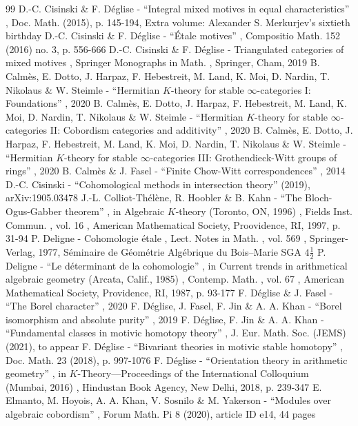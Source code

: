 \documentclass[11pt]{article}
\numberwithin{equation}{section}\renewcommand{\encodingdefault}{TU}
\theoremstyle{remark}
\theoremstyle{definition}
\numberwithin{equation}{thm}
\begin{document}
\begin{thebibliography}{99}
 D.-C. Cisinski \& F. Déglise - “Integral mixed motives in equal characteristics” , Doc. Math. (2015), p. 145-194, Extra volume: Alexander S. Merkurjev’s sixtieth birthday
 D.-C. Cisinski \& F. Déglise - “Étale motives” , Compositio Math. 152 (2016) no. 3, p. 556-666
 D.-C. Cisinski \& F. Déglise - Triangulated categories of mixed motives , Springer Monographs in Math. , Springer, Cham, 2019
 B. Calmès, E. Dotto, J. Harpaz, F. Hebestreit, M. Land, K. Moi, D. Nardin, T. Nikolaus \& W. Steimle - “Hermitian $K$-theory for stable $\infty $-categories I: Foundations” , 2020
 B. Calmès, E. Dotto, J. Harpaz, F. Hebestreit, M. Land, K. Moi, D. Nardin, T. Nikolaus \& W. Steimle - “Hermitian $K$-theory for stable $\infty $-categories II: Cobordism categories and additivity” , 2020
 B. Calmès, E. Dotto, J. Harpaz, F. Hebestreit, M. Land, K. Moi, D. Nardin, T. Nikolaus \& W. Steimle - “Hermitian $K$-theory for stable $\infty $-categories III: Grothendieck-Witt groups of rings” , 2020
 B. Calmès \& J. Fasel - “Finite Chow-Witt correspondences” , 2014
 D.-C. Cisinski - “Cohomological methods in intersection theory” (2019), arXiv:1905.03478
 J.-L. Colliot-Thélène, R. Hoobler \& B. Kahn - “The Bloch-Ogus-Gabber theorem” , in Algebraic $K$-theory (Toronto, ON, 1996) , Fields Inst. Commun. , vol. 16 , American Mathematical Society, Proovidence, RI, 1997, p. 31-94
 P. Deligne - Cohomologie étale , Lect. Notes in Math. , vol. 569 , Springer-Verlag, 1977, Séminaire de Géométrie Algébrique du Bois–Marie SGA $4\frac{1}{2}$
 P. Deligne - “Le déterminant de la cohomologie” , in Current trends in arithmetical algebraic geometry (Arcata, Calif., 1985) , Contemp. Math. , vol. 67 , American Mathematical Society, Providence, RI, 1987, p. 93-177
 F. Déglise \& J. Fasel - “The Borel character” , 2020
 F. Déglise, J. Fasel, F. Jin \& A. A. Khan - “Borel isomorphism and absolute purity” , 2019
 F. Déglise, F. Jin \& A. A. Khan - “Fundamental classes in motivic homotopy theory” , J. Eur. Math. Soc. (JEMS) (2021), to appear
 F. Déglise - “Bivariant theories in motivic stable homotopy” , Doc. Math. 23 (2018), p. 997-1076
 F. Déglise - “Orientation theory in arithmetic geometry” , in $K$-Theory—Proceedings of the International Colloquium (Mumbai, 2016) , Hindustan Book Agency, New Delhi, 2018, p. 239-347
 E. Elmanto, M. Hoyois, A. A. Khan, V. Sosnilo \& M. Yakerson - “Modules over algebraic cobordism” , Forum Math. Pi 8 (2020), article ID e14, 44 pages

\end{thebibliography}
\end{document}
